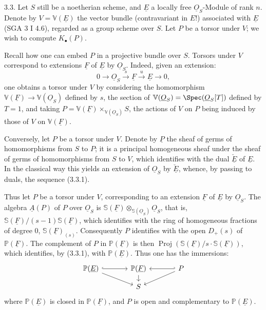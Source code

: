 3.3. Let $S$ still be a noetherian scheme, and $\underline{E}$ a locally free $\underline{O}_S$-Module of rank $n$. Denote by $V=\mathbb V(\underline{E})$ the vector bundle (contravariant in $E$!) associated with $\underline{E}$ (SGA 3 I 4.6), regarded as a group scheme over $S$. Let $P$ be a torsor under $V$; we wish to compute $K_\bullet(P)$.

Recall how one can embed $P$ in a projective bundle over $S$. Torsors under $V$ correspond to extensions $\underline{F}$ of $\underline{E}$ by $\underline{O}_S$. Indeed, given an extension:
\[
0\longrightarrow \underline{O}_S\xrightarrow{s}\underline{F}\xrightarrow{u}\underline{E}\longrightarrow 0,
\tag{3.3.1}
\]
one obtains a torsor under $V$ by considering the homomorphism $\mathbb V(\underline{F})\to \mathbb V(\underline{O}_S)$ defined by $s$, the section of $\mathbb V(\underline{O}_S)=\Spec(\underline{O}_S[T])$ defined by $T=1$, and taking $P=\mathbb V(\underline{F})\times_{\mathbb V(\underline{O}_S)}S$, the actions of $V$ on $P$ being induced by those of $V$ on $\mathbb V(\underline{F})$.

Conversely, let $P$ be a torsor under $V$. Denote by $\underline P$ the sheaf of germs of homomorphisms from $S$ to $P$; it is a principal homogeneous sheaf under the sheaf of germs of homomorphisms from $S$ to $V$, which identifies with the dual $\check{\underline{E}}$ of $\underline{E}$. In the classical way this yields an extension of $\underline{O}_S$ by $\check{\underline{E}}$, whence, by passing to duals, the sequence (3.3.1).


%

Thus let $P$ be a torsor under $V$, corresponding to an extension $\underline{F}$ of $\underline{E}$ by $\underline{O}_S$. The algebra $\underline{A}(P)$ of $P$ over $\underline{O}_S$ is $\mathbb S(\underline{F})\otimes_{\mathbb S(\underline{O}_S)}\underline{O}_S$, that is, $\mathbb S(\underline{F})/(s-1)\mathbb S(\underline{F})$, which identifies with the ring of homogeneous fractions of degree $0$, $\mathbb S(\underline{F})_{(s)}$. Consequently $P$ identifies with the open $D_+(s)$ of $\mathbb P(\underline{F})$. The complement of $P$ in $\mathbb P(\underline{F})$ is then $\operatorname{Proj}(\mathbb S(\underline{F})/s\cdot \mathbb S(\underline{F}))$, which identifies, by (3.3.1), with $\mathbb P(\underline{E})$. Thus one has the immersions:
\[
\begin{tikzcd}[column sep=large,row sep=small]
\mathbb P(\underline{E}) \arrow[r,hook] \arrow[dr] & \mathbb P(\underline{F}) \arrow[d] & P \arrow[l,hook'] \arrow[dl]\\
& S &
\end{tikzcd}
\]
where $\mathbb P(\underline{E})$ is closed in $\mathbb P(\underline{F})$, and $P$ is open and complementary to $\mathbb P(\underline{E})$.

